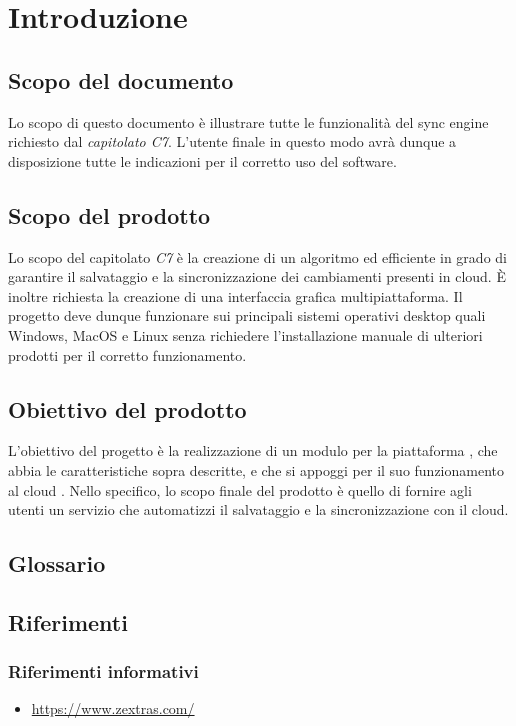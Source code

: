 \section{Introduzione}
\subsection{Scopo del documento}
Lo scopo di questo documento è illustrare tutte le funzionalità del sync engine richiesto dal \textit{capitolato C7}. L'utente finale in questo modo avrà dunque a disposizione tutte le indicazioni per il corretto uso del software.

\subsection{Scopo del prodotto}
Lo scopo del capitolato \textit{C7} è la creazione di un algoritmo  ed efficiente in grado di garantire il salvataggio e la sincronizzazione dei cambiamenti presenti in cloud. È inoltre richiesta la creazione di una interfaccia grafica multipiattaforma. Il progetto deve dunque funzionare sui principali sistemi operativi desktop quali Windows, MacOS e Linux senza richiedere l'installazione manuale di ulteriori prodotti per il corretto funzionamento. 
\subsection{Obiettivo del prodotto}
L'obiettivo del progetto è la realizzazione di un modulo per la piattaforma , che abbia le caratteristiche sopra descritte, e che si appoggi per il suo funzionamento al cloud .
Nello specifico, lo scopo finale del prodotto è quello di fornire agli utenti un servizio che automatizzi il salvataggio e la sincronizzazione con il cloud.

\subsection{Glossario}

\subsection{Riferimenti}
\subsubsection{Riferimenti informativi}

\begin{itemize}
	\item \url{https://www.zextras.com/}
\end{itemize}


